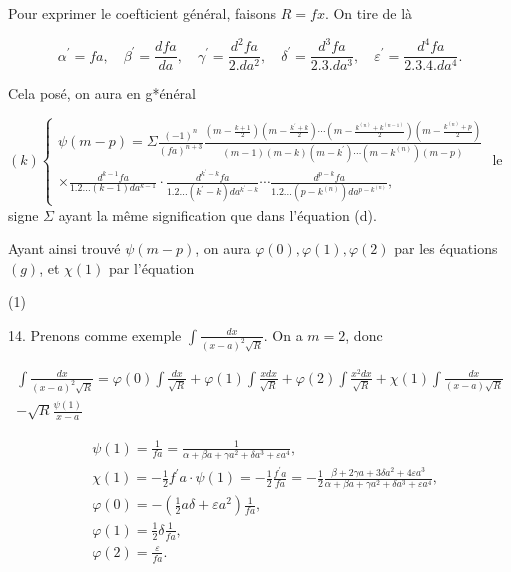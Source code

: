 \documentclass{article}
\begin{document}
Pour exprimer le coefticient général, faisons \(R=f x\). On tire de là

\[
\alpha^{\prime}=f a, \quad \beta^{\prime}=\frac{d f a}{d a}, \quad \gamma^{\prime}=\frac{d^{2} f a}{2 . d a^{2}}, \quad \delta^{\prime}=\frac{d^{3} f a}{2.3 . d a^{3}}, \quad \varepsilon^{\prime}=\frac{d^{4} f a}{2.3 .4 . d a^{4}} .
\]

Cela posé, on aura en g*énéral

\((k)\left\{\begin{array}{c}\psi(m-p)=\Sigma \frac{(-1)^{n}}{(f a)^{n+3}} \frac{\left(m-\frac{k+1}{2}\right)\left(m-\frac{k^{\prime}+k}{2}\right) \cdots\left(m-\frac{k^{(n)}+k^{(n-1)}}{2}\right)\left(m-\frac{k^{(n)}+p}{2}\right)}{(m-1)(m-k)\left(m-k^{\prime}\right) \cdots\left(m-k^{(n)}\right)(m-p)} \\ \times \frac{d^{k-1} f a}{1.2 \ldots(k-1) d a^{k-1}} \cdot \frac{d^{k^{\prime}-k} f a}{1.2 \ldots\left(k^{\prime}-k\right) d a^{k^{\prime}-k}} \cdots \frac{d^{p-k} f a}{1.2 \ldots\left(p-k^{(n)}\right) d a^{p-k^{(n)}}},\end{array}\right.\) le signe \(\Sigma\) ayant la même signification que dans l'équation (d).

Ayant ainsi trouvé \(\psi(m-p)\), on aura \(\varphi(0), \varphi(1), \varphi(2)\) par les équations \((g)\), et \(\chi(1)\) par l'équation

(1)


14. Prenons comme exemple \(\int \frac{d x}{(x-a)^{2} \sqrt{R}}\). On a \(m=2\), donc

\[
\begin{array}{r}
\int \frac{d x}{(x-a)^{2} \sqrt{R}}=\varphi(0) \int \frac{d x}{\sqrt{R}}+\varphi(1) \int \frac{x d x}{\sqrt{R}}+\varphi(2) \int \frac{x^{2} d x}{\sqrt{R}}+\chi(1) \int \frac{d x}{(x-a) \sqrt{R}} \\
-\sqrt{R} \frac{\psi(1)}{x-a}
\end{array}
\]

\[
\begin{aligned}
& \psi(1)=\frac{1}{f a}=\frac{1}{\alpha+\beta a+\gamma a^{2}+\delta a^{3}+\varepsilon a^{4}}, \\
& \chi(1)=-\frac{1}{2} f^{\prime} a \cdot \psi(1)=-\frac{1}{2} \frac{f^{\prime} a}{f a}=-\frac{1}{2} \frac{\beta+2 \gamma a+3 \delta a^{2}+4 \varepsilon a^{3}}{\alpha+\beta a+\gamma a^{2}+\delta a^{3}+\varepsilon a^{4}}, \\
& \varphi(0)=-\left(\frac{1}{2} a \delta+\varepsilon a^{2}\right) \frac{1}{f a}, \\
& \varphi(1)=\frac{1}{2} \delta \frac{1}{f a}, \\
& \varphi(2)=\frac{\varepsilon}{f a} .
\end{aligned}
\]
\end{document}
